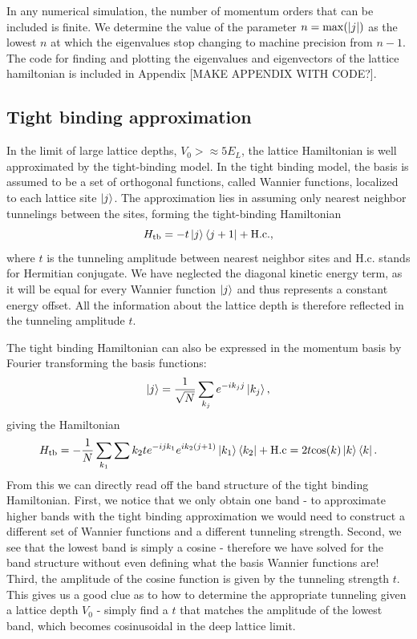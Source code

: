 In any numerical simulation, the number of momentum orders that can be included is finite. We determine the value of the parameter $n = {\rm max}(|j|)$ as the lowest $n$ at which the eigenvalues stop changing to machine precision from $n-1$. The code for finding and plotting the eigenvalues and eigenvectors of the lattice hamiltonian is included in Appendix [MAKE APPENDIX WITH CODE?].

\subsection{Tight binding approximation}\label{sec:tightBinding}

In the limit of large lattice depths, $V_0 > \approx 5 E_L$, the lattice Hamiltonian is well approximated by the tight-binding model. In the tight binding model, the basis is assumed to be a set of orthogonal functions, called Wannier functions, localized to each lattice site $\mathinner{|{j}\rangle}$.  The approximation lies in assuming only nearest neighbor tunnelings between the sites, forming the tight-binding Hamiltonian
\begin{equation}
H_{\rm tb} = - t \mathinner{|{j}\rangle}\mathinner{\langle{j+1}|} + {\rm H.c.},
\end{equation}
where $t$ is the tunneling amplitude between nearest neighbor sites and H.c. stands for Hermitian conjugate. We have neglected the diagonal kinetic energy term, as it will be equal for every Wannier function $\mathinner{|{j}\rangle}$ and thus represents a constant energy offset. All the information about the lattice depth is therefore reflected in the tunneling amplitude $t$. 

The tight binding Hamiltonian can also be expressed in the momentum basis by Fourier transforming the basis functions:
\begin{equation}
\mathinner{|{j}\rangle} = \frac{1}{\sqrt{N}}\sum_{k_j} e^{-i k_j j}\mathinner{|{k_j}\rangle},
\end{equation}
giving the Hamiltonian
\begin{equation}
H_{\rm tb} = - \frac{1}{N}\sum_{k_1}\sum{k_2} t e^{-i j k_1} e^{i k_2 (j+1)} \mathinner{|{k_1}\rangle}\mathinner{\langle{k_2}|} + {\rm H.c} = 2 t {\rm cos}(k)\mathinner{|{k}\rangle}\mathinner{\langle{k}|}.
\end{equation}  
From this we can directly read off the band structure of the tight binding Hamiltonian. First, we notice that we only obtain one band - to approximate higher bands with the tight binding approximation we would need to construct a different set of Wannier functions and a different tunneling strength. Second, we see that the lowest band is simply a cosine - therefore we have solved for the band structure without even defining what the basis Wannier functions are! Third, the amplitude of the cosine function is given by the tunneling strength $t$. This gives us a good clue as to how to determine the appropriate tunneling given a lattice depth $V_0$ - simply find a $t$ that matches the amplitude of the lowest band, which becomes cosinusoidal in the deep lattice limit. 

